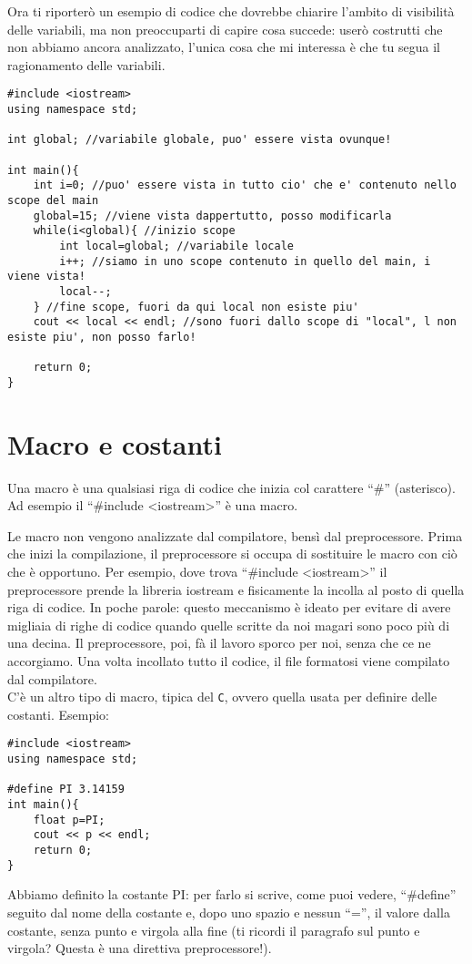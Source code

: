 	Ora ti riporterò un esempio di codice che dovrebbe chiarire l'ambito di visibilità delle variabili, ma non preoccuparti di capire cosa succede: userò costrutti che non abbiamo ancora analizzato, l'unica cosa che mi interessa è che tu segua il ragionamento delle variabili. 
	
	\begin{lstlisting}
#include <iostream>
using namespace std;

int global; //variabile globale, puo' essere vista ovunque!

int main(){
	int i=0; //puo' essere vista in tutto cio' che e' contenuto nello scope del main	
	global=15; //viene vista dappertutto, posso modificarla
	while(i<global){ //inizio scope
		int local=global; //variabile locale
		i++; //siamo in uno scope contenuto in quello del main, i viene vista!
		local--;
	} //fine scope, fuori da qui local non esiste piu'
	cout << local << endl; //sono fuori dallo scope di "local", l non esiste piu', non posso farlo!
		
	return 0;
}
	\end{lstlisting}
	\section{Macro e costanti}
	Una macro è una qualsiasi riga di codice che inizia col carattere ``\#'' (asterisco). Ad esempio il ``\#include <iostream>'' è una macro. 
	
	Le macro non vengono analizzate dal compilatore, bensì dal preprocessore. Prima che inizi la compilazione, il preprocessore si occupa di sostituire le macro con ciò che è opportuno. Per esempio, dove trova ``\#include <iostream>'' il preprocessore prende la libreria iostream e fisicamente la incolla al posto di quella riga di codice. In poche parole: questo meccanismo è ideato per evitare di avere migliaia di righe di codice quando quelle scritte da noi magari sono poco più di una decina. Il preprocessore, poi, fà il lavoro sporco per noi, senza che ce ne accorgiamo. Una volta incollato tutto il codice, il file formatosi viene compilato dal compilatore.\\
	
	C'è un altro tipo di macro, tipica del \verb|C|, ovvero quella usata per definire delle costanti. 
	Esempio:
	\begin{lstlisting}
#include <iostream>
using namespace std;

#define PI 3.14159
int main(){
	float p=PI;
	cout << p << endl;
	return 0;
}
	\end{lstlisting}
	Abbiamo definito la costante PI: per farlo si scrive, come puoi vedere, ``\#define'' seguito dal nome della costante e, dopo uno spazio e nessun ``='', il valore dalla costante,  senza punto e virgola alla fine (ti ricordi il paragrafo sul punto e virgola? Questa è una direttiva preprocessore!).
	
